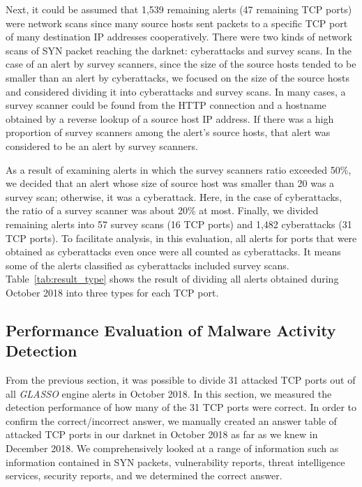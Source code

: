 \documentclass[conference]{IEEEtran}
\begin{document}
Next, it could be assumed that 1,539 remaining alerts (47 remaining TCP ports) were network scans since many source hosts sent packets to a specific TCP port of many destination IP addresses cooperatively.
There were two kinds of network scans of SYN packet reaching the darknet: cyberattacks and survey scans.
In the case of an alert by survey scanners, since the size of the source hosts tended to be smaller than an alert by cyberattacks, we focused on the size of the source hosts and considered dividing it into cyberattacks and survey scans.
In many cases, a survey scanner could be found from the HTTP connection and a hostname obtained by a reverse lookup of a source host IP address.
If there was a high proportion of survey scanners among the alert's source hosts, that alert was considered to be an alert by survey scanners.

As a result of examining alerts in which the survey scanners ratio exceeded 50\%, we decided that an alert whose size of source host was smaller than 20 was a survey scan; otherwise, it was a cyberattack.
Here, in the case of cyberattacks, the ratio of a survey scanner was about 20\% at most.
Finally, we divided remaining alerts into 57 survey scans (16 TCP ports) and 1,482 cyberattacks (31 TCP ports).
To facilitate analysis, in this evaluation, all alerts for ports that were obtained as cyberattacks even once were all counted as cyberattacks.
It means some of the alerts classified as cyberattacks included survey scans.
Table~\ref{tab:result_type} shows the result of dividing all alerts obtained during October 2018 into three types for each TCP port.



\subsection{Performance Evaluation of Malware Activity Detection}
\label{Performance}
From the previous section, it was possible to divide 31 attacked TCP ports out of all \textit{GLASSO} engine alerts in October 2018.
In this section, we measured the detection performance of how many of the 31 TCP ports were correct.
In order to confirm the correct/incorrect answer, we manually created an answer table of attacked TCP ports in our darknet in October 2018 as far as we knew in December 2018.
We comprehensively looked at a range of information such as information contained in SYN packets, vulnerability reports, threat intelligence services, security reports, and we determined the correct answer.
\end{document}
